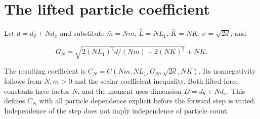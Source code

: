 \documentclass[11pt,a4paper]{article}
\begin{document}
\section{\texorpdfstring{The lifted particle coefficient}{The lifted particle coefficient}}


Let \(d=d_\theta+Nd_x\) and substitute \(\bar m=Nm\), \(\bar L=NL_1\), \(\bar K=NK\), \(\sigma=\sqrt{2d}\), and

\[G_N=\sqrt{2(NL_1)^2d/(Nm)+2(NK)^2}+NK.\]

The resulting coefficient is \(C_N=C(Nm,NL_1,G_N,\sqrt{2d},NK)\). Its nonnegativity follows from \(N,m>0\) and the scalar coefficient inequality. Both lifted force constants have factor \(N\), and the moment uses dimension \(D=d_\theta+Nd_x\). This defines \(C_N\) with all particle dependence explicit before the forward step is varied. Independence of the step does not imply independence of particle count.
\end{document}
